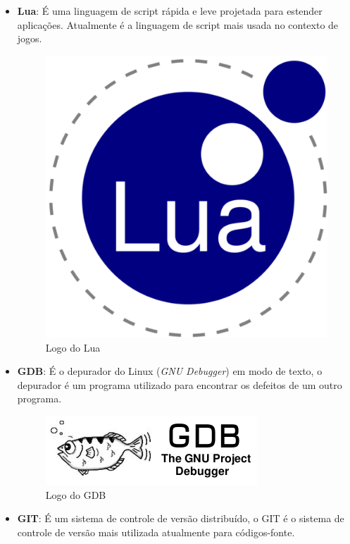 \documentclass[11pt]{article} %
\begin{document}
\begin{itemize}
\item \textbf{Lua}: É uma linguagem de script rápida e leve projetada para estender aplicações. Atualmente é a linguagem de script mais usada no contexto de jogos.

\begin{figure}[!htp]
\centering
\includegraphics[scale=0.2]{pictures/lua.png}
\caption{Logo do Lua}
\label{Logo do Lua}
\end{figure}

\item \textbf{GDB}: É o depurador do Linux (\textit{GNU Debugger}) em modo de texto, o depurador é um programa utilizado para encontrar os defeitos de um outro programa.

\begin{figure}[!htp]
\centering
\includegraphics[scale=0.3]{pictures/GDB.png}
\caption{Logo do GDB}
\label{Logo do GDB}
\end{figure}

\item \textbf{GIT}: É um sistema de controle de versão distribuído, o GIT é o sistema de controle de versão mais utilizada atualmente para códigos-fonte.


\end{itemize}
\end{document}
